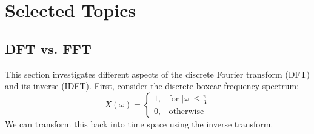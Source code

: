 \documentclass[11pt, letterpage]{article}
\begin{document}
\section{Selected Topics}

\subsection{DFT vs. FFT}
This section investigates different aspects of the discrete Fourier transform
(DFT) and its inverse (IDFT). First, consider the discrete boxcar frequency
spectrum:
\begin{equation}
  X(\omega) = \left\{
  \begin{array}{ll}
    1, & \text{for} \; |\omega| \leq \frac{\pi}{3} \\
    0, & \text{otherwise}
  \end{array}
  \right.
\end{equation}
We can transform this back into time space using the inverse transform.
\end{document}
